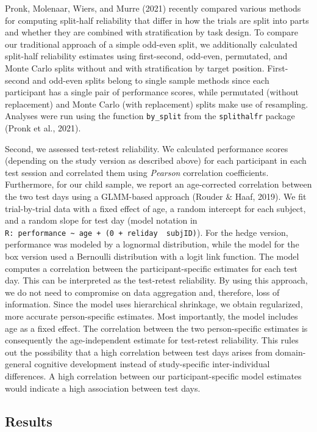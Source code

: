 \documentclass[
  man,floatsintext]{apa6}
\begin{document}
Pronk, Molenaar, Wiers, and Murre (2021) recently compared various methods for computing split-half reliability that differ in how the trials are split into parts and whether they are combined with stratification by task design.
To compare our traditional approach of a simple odd-even split, we additionally calculated split-half reliability estimates using first-second, odd-even, permutated, and Monte Carlo splits without and with stratification by target position.
First-second and odd-even splits belong to single sample methods since each participant has a single pair of performance scores, while permutated (without replacement) and Monte Carlo (with replacement) splits make use of resampling.
Analyses were run using the function \texttt{by\_split} from the \texttt{splithalfr} package (Pronk et al., 2021).

Second, we assessed test-retest reliability.
We calculated performance scores (depending on the study version as described above) for each participant in each test session and correlated them using \emph{Pearson} correlation coefficients.
Furthermore, for our child sample, we report an age-corrected correlation between the two test days using a GLMM-based approach (Rouder \& Haaf, 2019).
We fit trial-by-trial data with a fixed effect of age, a random intercept for each subject, and a random slope for test day (model notation in \texttt{R:\ performance\ \textasciitilde{}\ age\ +\ (0\ +\ reliday\ \textbar{}\ subjID)}).
For the hedge version, performance was modeled by a lognormal distribution, while the model for the box version used a Bernoulli distribution with a logit link function.
The model computes a correlation between the participant-specific estimates for each test day.
This can be interpreted as the test-retest reliability.
By using this approach, we do not need to compromise on data aggregation and, therefore, loss of information.
Since the model uses hierarchical shrinkage, we obtain regularized, more accurate person-specific estimates.
Most importantly, the model includes age as a fixed effect.
The correlation between the two person-specific estimates is consequently the age-independent estimate for test-retest reliability.
This rules out the possibility that a high correlation between test days arises from domain-general cognitive development instead of study-specific inter-individual differences.
A high correlation between our participant-specific model estimates would indicate a high association between test days.

\hypertarget{results-1}{%
\subsection{Results}\label{results-1}}
\end{document}
